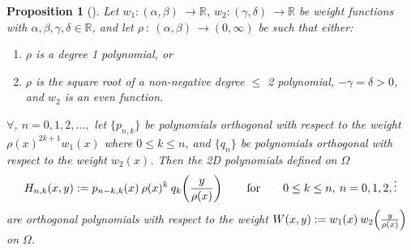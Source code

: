 \documentclass[11pt, oneside]{article}   	%
\newcommand{\R}{\mathbb{R}}
\newcommand{\hdop}{H}
\newcommand{\hdopnk}{\hdop_{n,k}}
\newtheorem{proposition}{Proposition}
\begin{document}
\begin{proposition}[{\cite[p55--56]{dunkl2014orthogonal}}]\label{prop:construction}
Let \(w_1 : (\alpha,\beta) \: \to \R\), \(w_2 : (\gamma,\delta) \: \to \R\) be weight functions with \(\alpha,\beta,\gamma,\delta \in \R\), and let \(\rho \: : \: (\alpha,\beta) \: \to (0,\infty)\) be such that either:
\begin{enumerate}
\item  \(\rho\) is a degree 1 polynomial, or 
\item \(\rho\) is the square root of a non-negative degree \(\le\) 2 polynomial, \(-\gamma = \delta > 0\), and \(w_2\) is an even function.
\end{enumerate}
$\forall$, $n = 0,1,2,\dots, $ let $\{p_{n,k}\}$ be polynomials orthogonal with respect to the weight $\rho(x)^{2k+1} w_1(x)$ where $0 \le k \le n$, and $\{q_{n}\}$ be polynomials orthogonal with respect to the weight $w_2(x)$. Then the 2D polynomials defined on $\Omega$
$$
\hdopnk(x,y) := p_{n-k,k}(x) \: \rho(x)^k \: q_k\fpr(\frac{y}{\rho(x)}) \qquad\hbox{for} \qquad 0 \le k \le n, \: n = 0,1,2,\dots
$$
are orthogonal polynomials with respect to the weight \(W(x,y) := w_1(x) \: w_2\fpr(\frac{y}{\rho(x)}) \) on $\Omega$. 
\end{proposition}
\end{document}
